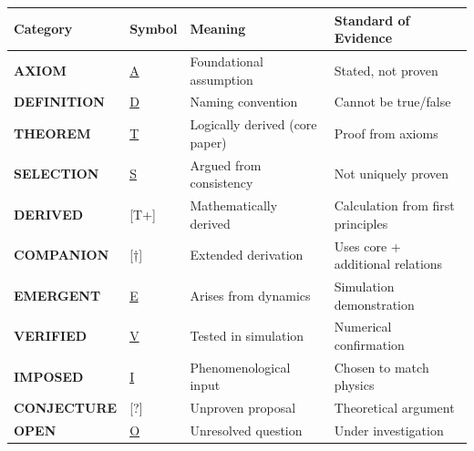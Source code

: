 \documentclass[
  11pt,
  letterpaper,
  twoside,
  openany]{book}
\begin{document}
\begin{longtable}[]{@{}
  >{\raggedright\arraybackslash}p{}
  >{\raggedright\arraybackslash}p{}
  >{\raggedright\arraybackslash}p{}
  >{\raggedright\arraybackslash}p{}@{}}
\toprule\noalign{}
\begin{minipage}[b]{\linewidth}\raggedright
Category
\end{minipage} & \begin{minipage}[b]{\linewidth}\raggedright
Symbol
\end{minipage} & \begin{minipage}[b]{\linewidth}\raggedright
Meaning
\end{minipage} & \begin{minipage}[b]{\linewidth}\raggedright
Standard of Evidence
\end{minipage} \\
\midrule\noalign{}
\endhead
\bottomrule\noalign{}
\endlastfoot
\textbf{AXIOM} & \hyperref[a]{A} & Foundational assumption & Stated, not
proven \\
\textbf{DEFINITION} & \hyperref[d]{D} & Naming convention & Cannot be
true/false \\
\textbf{THEOREM} & \hyperref[t]{T} & Logically derived (core paper) &
Proof from axioms \\
\textbf{SELECTION} & \hyperref[s]{S} & Argued from consistency & Not
uniquely proven \\
\textbf{DERIVED} & {[}T+{]} & Mathematically derived & Calculation from
first principles \\
\textbf{COMPANION} & {[}†{]} & Extended derivation & Uses core +
additional relations \\
\textbf{EMERGENT} & \hyperref[e]{E} & Arises from dynamics & Simulation
demonstration \\
\textbf{VERIFIED} & \hyperref[v]{V} & Tested in simulation & Numerical
confirmation \\
\textbf{IMPOSED} & \hyperref[i]{I} & Phenomenological input & Chosen to
match physics \\
\textbf{CONJECTURE} & {[}?{]} & Unproven proposal & Theoretical
argument \\
\textbf{OPEN} & \hyperref[o]{O} & Unresolved question & Under
investigation \\
\end{longtable}
\end{document}
